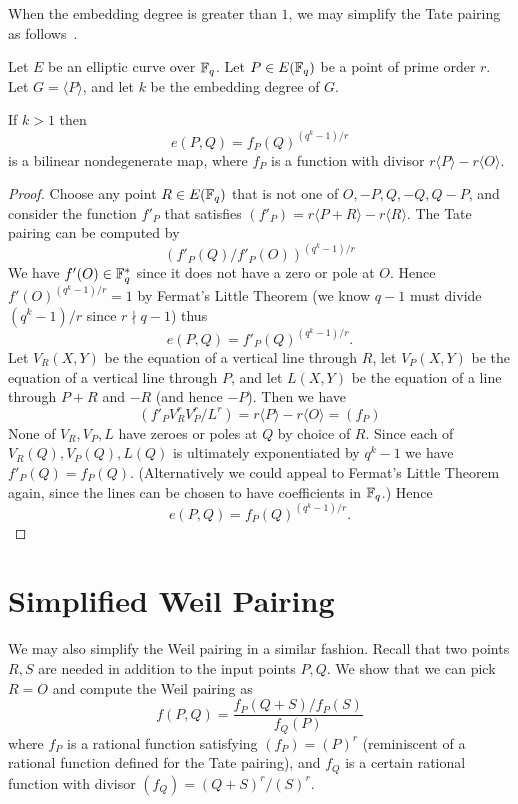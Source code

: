 When the embedding degree is greater than $1$, we may simplify the Tate
pairing as follows~\cite{bakls, bals2}.

\begin{theorem}
Let $E$ be an elliptic curve over $\mathbb{F}_q$.
Let $P \in E(\mathbb{F}_q)$ be a point of prime order $r$.
Let $G = \langle P \rangle$, and let $k$ be the embedding degree of $G$.

If $k > 1$ then
\[
e(P,Q) = f_P(Q)^{(q^k-1)/r}
\]
is a bilinear nondegenerate map,
where $f_P$ is a function with divisor $r\langle P\rangle - r\langle O\rangle$.
\end{theorem}

\begin{proof}
Choose any point $R \in E(\mathbb{F}_q)$ that is not one of
$O, -P, Q, -Q, Q - P$,
and consider the function $f'_P$ that satisfies $(f'_P) = r\langle P+R\rangle
- r\langle R \rangle$.
The Tate pairing can be computed by
\[
(f'_P(Q)/f'_P(O))^{(q^k-1)/r}
\]
We have $f'(O) \in \mathbb{F}_q^*$ since it does not have a zero or pole
at $O$. Hence
$f'(O)^{(q^k-1)/r} = 1$ by Fermat's Little Theorem (we know $q-1$ must
divide $(q^k - 1)/r$ since $r\nmid q-1$) thus
\[ e(P,Q) = f'_P(Q)^{(q^k-1)/r} . \]
Let $V_R(X,Y)$ be the equation of a vertical line through $R$,
let $V_P(X,Y)$ be the equation of a vertical line through $P$,
and let $L(X,Y)$ be the equation of a line through $P+R$ and $-R$ (and hence
$-P$).
Then we have
\[ (f'_P V_R^r V_P^r / L^r) = r \langle P \rangle - r \langle O \rangle
= (f_P) \]
None of $V_R, V_P, L$ have zeroes or poles at $Q$ by choice of $R$.
Since each of $V_R(Q), V_P(Q), L(Q)$ is ultimately exponentiated by $q^k-1$
we have $f'_P(Q) = f_P(Q)$.
(Alternatively we could appeal to Fermat's Little Theorem
again, since the lines can be chosen to have coefficients in $\mathbb{F}_q$.)
Hence
\[e(P,Q) = f_P(Q)^{(q^k-1)/r} . \]
\end{proof}

\section {Simplified Weil Pairing}

We may also simplify the Weil pairing in a similar fashion.
Recall that two points $R, S$ are needed in addition to the input points
$P,Q$. We show that we can pick $R = O$ and compute the Weil pairing as
\[ f(P,Q) = \frac{f_P(Q+S)/f_P(S)}{f_Q(P)} \]
where $f_P$ is a rational function
satisfying $(f_P) = (P)^r$ (reminiscent of a rational function defined
for the Tate pairing),
and $f_Q$ is a certain rational function with divisor
$(f_Q) = (Q+S)^r /(S)^r$.

